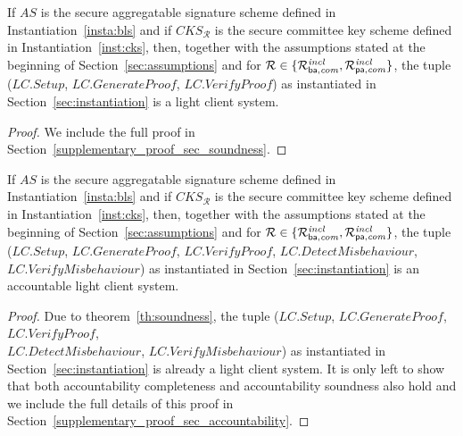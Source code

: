 \begin{theorem}
\label{th:soundness} 
If $\mathit{AS}$ is the secure aggregatable signature scheme defined in Instantiation~\ref{insta:bls} and if 
$\mathit{CKS_{\mathcal{R}}}$ is the secure committee key scheme defined in Instantiation~\ref{inst:cks}, then, together with 
the assumptions stated at the beginning of Section~\ref{sec:assumptions} and for $\mathcal{R} \in \{ \mathcal{R}^{\mathit{incl}}_{\mathsf{ba},\mathit{com}}, \mathcal{R}^{\mathit{incl}}_{\mathsf{pa},\mathit{com}} \}$, the tuple 
($\mathit{LC.Setup}$, $\mathit{LC.GenerateProof}$, $\mathit{LC.VerifyProof}$) as instantiated in Section~\ref{sec:instantiation} is a light client system.
\end{theorem}


\begin{proof} 
We include the full proof in Section~\ref{supplementary_proof_sec_soundness}.   
\end{proof}

\begin{theorem} 
\label{th:accountability_results}
If $\mathit{AS}$ is the secure aggregatable signature scheme defined in Instantiation~\ref{insta:bls} and if 
$\mathit{CKS_{\mathcal{R}}}$ is the secure committee key scheme defined in Instantiation~\ref{inst:cks}, then, together 
with the assumptions stated at the beginning of Section~\ref{sec:assumptions} and for $\mathcal{R} \in \{ \mathcal{R}^{\mathit{incl}}_{\mathsf{ba},\mathit{com}}, \mathcal{R}^{\mathit{incl}}_{\mathsf{pa},\mathit{com}} \}$, the tuple 
($\mathit{LC.Setup}$, $\mathit{LC.GenerateProof}$, $\mathit{LC.VerifyProof}$, $\mathit{LC.DetectMisbehaviour}$, 
$\mathit{LC.VerifyMisbehaviour}$) as instantiated in Section~\ref{sec:instantiation} is an accountable light client system.
\end{theorem}
\begin{proof}
\noindent Due to theorem~\ref{th:soundness}, the tuple 
($\mathit{LC.Setup}$, $\mathit{LC.GenerateProof}$, $\mathit{LC.VerifyProof}$, \\ $\mathit{LC.DetectMisbehaviour}$, 
$\mathit{LC.VerifyMisbehaviour}$) as instantiated in Section~\ref{sec:instantiation} is already a light client system. 
It is only left to show that both accountability completeness and accountability soundness also hold and we include the full details of this proof in 
Section~\ref{supplementary_proof_sec_accountability}.   
\end{proof}

